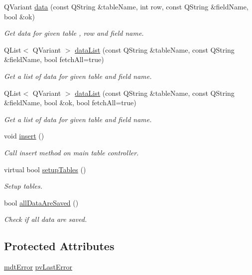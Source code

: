 \begin{DoxyCompactItemize}
Q\-Variant \hyperlink{classmdt_sql_form_ab0c251a35567dd34f244fea715a7a3d4}{data} (const Q\-String \&table\-Name, int row, const Q\-String \&field\-Name, bool \&ok)
\begin{DoxyCompactList}\small\item\em Get data for given table , row and field name. \end{DoxyCompactList}\item 
Q\-List$<$ Q\-Variant $>$ \hyperlink{classmdt_sql_form_a15a92b2116f2fd3a37344afb66b77a3d}{data\-List} (const Q\-String \&table\-Name, const Q\-String \&field\-Name, bool fetch\-All=true)
\begin{DoxyCompactList}\small\item\em Get a list of data for given table and field name. \end{DoxyCompactList}\item 
Q\-List$<$ Q\-Variant $>$ \hyperlink{classmdt_sql_form_a271b8bc1adac05a36d2db24d0b9cdaff}{data\-List} (const Q\-String \&table\-Name, const Q\-String \&field\-Name, bool \&ok, bool fetch\-All=true)
\begin{DoxyCompactList}\small\item\em Get a list of data for given table and field name. \end{DoxyCompactList}\item 
void \hyperlink{classmdt_sql_form_a2138e4e1236a9b1c002825ddd9e59298}{insert} ()
\begin{DoxyCompactList}\small\item\em Call insert method on main table controller. \end{DoxyCompactList}\item 
virtual bool \hyperlink{classmdt_sql_form_a27fe6e45aa5d4d7782aad9833e6de20b}{setup\-Tables} ()
\begin{DoxyCompactList}\small\item\em Setup tables. \end{DoxyCompactList}\item 
bool \hyperlink{classmdt_sql_form_a1e14cbb5bf04d2eb1c703862a6084031}{all\-Data\-Are\-Saved} ()
\begin{DoxyCompactList}\small\item\em Check if all data are saved. \end{DoxyCompactList}\end{DoxyCompactItemize}
\subsection*{Protected Attributes}
\begin{DoxyCompactItemize}
\item 
\hyperlink{classmdt_error}{mdt\-Error} \hyperlink{classmdt_sql_form_afc24e8dedd1249a29708347fdff560fd}{pv\-Last\-Error}
\end{DoxyCompactItemize}



